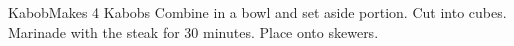\documentclass[]{article}
\title{}
\author{}
\begin{document}
\begin{recipe}{Kabob}{}{Makes 4 Kabobs}
	Combine in a bowl and set aside portion. 
	Cut into cubes.
	Marinade with the steak for 30 minutes. Place onto skewers. 

	

\end{recipe}
\end{document}
